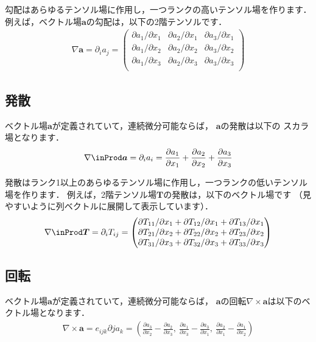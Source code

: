 勾配はあらゆるテンソル場に作用し，一つランクの高いテンソル場を作ります．
例えば，ベクトル場$\bm{a}$の勾配は，以下の2階テンソルです．
\begin{align}
 \label{eq:2.3}
 \nabla\bm{a} = \partial_{i}a_{j} =
 \begin{pmatrix}
  \partial a_{1}/\partial x_{1} & \partial a_{2}/\partial x_{1} & \partial a_{3}/\partial x_{1} \\
  \partial a_{1}/\partial x_{2} & \partial a_{2}/\partial x_{2} & \partial a_{3}/\partial x_{2} \\
  \partial a_{1}/\partial x_{3} & \partial a_{2}/\partial x_{3} & \partial a_{3}/\partial x_{3} \\
 \end{pmatrix}
\end{align}


\subsection{発散}
\label{ssec:2.1.2}
ベクトル場$\bm{a}$が定義されていて，連続微分可能ならば，
$\bm{a}$の発散は以下の
%  
スカラ場となります．
\begin{align}
 \label{eq:2.4}
 \nabla \inProd \bm{a} = \partial_{i}a_{i}
 = \frac{\partial a_{1}}{\partial x_{1}}
 + \frac{\partial a_{2}}{\partial x_{2}}
 + \frac{\partial a_{3}}{\partial x_{3}}
\end{align}

発散はランク1以上のあらゆるテンソル場に作用し，一つランクの低いテンソル場を作ります．
例えば，2階テンソル場$\bm{T}$の発散は，以下のベクトル場です
（見やすいように列ベクトルに展開して表示しています）．
\begin{align}
 \label{eq:2.5}
 \nabla \inProd \bm{T} = \partial_{i}T_{ij} =
 \begin{pmatrix}
  \partial T_{11}/\partial x_{1} + \partial T_{12}/\partial x_{1} + \partial T_{13}/\partial x_{1} \\
  \partial T_{21}/\partial x_{2} + \partial T_{22}/\partial x_{2} + \partial T_{23}/\partial x_{2} \\
  \partial T_{31}/\partial x_{3} + \partial T_{32}/\partial x_{3} + \partial T_{33}/\partial x_{3} \\
 \end{pmatrix}
\end{align}


\subsection{回転}
\label{ssec:2.1.3}
ベクトル場$\bm{a}$が定義されていて，連続微分可能ならば，
$\bm{a}$の回転$\nabla \times \bm{a}$は以下のベクトル場となります．
\begin{align}
 \label{eq:2.6}
 \nabla \times \bm{a} = e_{ijk}\partial{j}a_{k}
 = \left(\frac{\partial a_{3}}{\partial x_{2}} - \frac{\partial a_{2}}{\partial x_{3}},\
 \frac{\partial a_{1}}{\partial x_{3}} - \frac{\partial a_{3}}{\partial x_{1}},\
 \frac{\partial a_{2}}{\partial x_{1}} - \frac{\partial a_{1}}{\partial x_{2}}\right)
\end{align}

